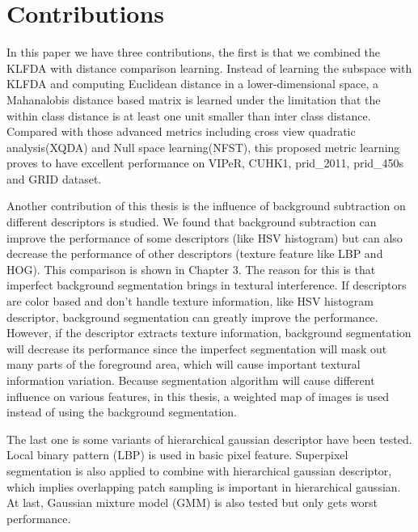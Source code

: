 \section{Contributions}

In this paper we have three contributions, the first is that we combined the KLFDA with distance comparison learning. Instead of learning the subspace with KLFDA and computing Euclidean distance in a lower-dimensional space, a Mahanalobis distance based matrix is learned under the limitation that the within class distance is at least one unit smaller than inter class distance. Compared with those advanced metrics including cross view quadratic analysis(XQDA) \cite{LOMO} and Null space learning(NFST), this proposed metric learning proves to have excellent performance on VIPeR, CUHK1, prid\_2011, prid\_450s and GRID dataset.

Another contribution of this thesis is the influence of background subtraction on different descriptors is studied. We found that background subtraction can improve the performance of some descriptors (like HSV histogram) but can also decrease the performance of  other descriptors (texture feature like LBP and HOG). This comparison is shown in Chapter 3. The reason for this is that imperfect background segmentation brings in textural interference. If descriptors are color based and don't handle texture information, like HSV histogram descriptor, background segmentation can greatly improve the performance. However, if the descriptor extracts texture information, background segmentation will decrease its performance since the imperfect segmentation will mask out many parts of the foreground area, which will cause important textural information variation. Because segmentation algorithm will cause different influence on various features, in this thesis, a weighted map of images is used instead of using the background segmentation.

The last one is some variants of hierarchical gaussian descriptor have been tested. Local binary pattern (LBP) is used in basic pixel feature. Superpixel segmentation is also applied to combine with hierarchical gaussian descriptor, which implies overlapping patch sampling is important in hierarchical gaussian. At last, Gaussian mixture model (GMM) is also tested but only gets worst performance.

